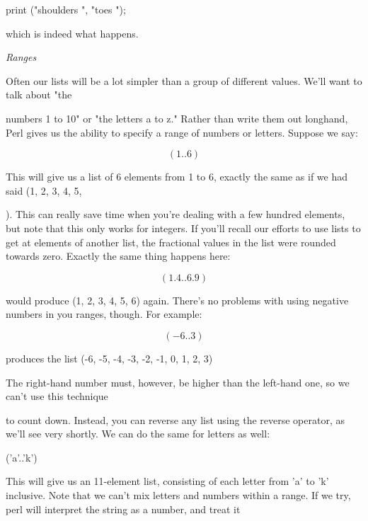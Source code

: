 \documentclass[a4paper,11pt]{book}
\begin{document}
\noindent 

\noindent 

\noindent print ("shoulders ", "toes ");

\noindent 

\noindent which is indeed what happens.

\noindent 

\noindent 

\noindent \textit{Ranges}

\noindent Often our lists will be a lot simpler than a group of different values. We'll want to talk about "the

\noindent numbers 1 to 10" or "the letters a to z." Rather than write them out longhand, Perl gives us the ability to specify a range of numbers or letters. Suppose we say:

\noindent 

\[(1 .. 6)\] 


\noindent This will give us a list of 6 elements from 1 to 6, exactly the same as if we had said (1, 2, 3, 4, 5,

). This can really save time when you're dealing with a few hundred elements, but note that this only works for integers. If you'll recall our efforts to use lists to get at elements of another list, the fractional values in the list were rounded towards zero. Exactly the same thing happens here:

\noindent 

\[(1.4 .. 6.9)\] 


\noindent would produce (1, 2, 3, 4, 5, 6) again. There's no problems with using negative numbers in you ranges, though. For example:

\noindent 

\[(-6 .. 3)\] 


\noindent produces the list (-6, -5, -4, -3, -2, -1, 0, 1, 2, 3)

\noindent 

\noindent The right-hand number must, however, be higher than the left-hand one, so we can't use this technique

\noindent to count down. Instead, you can reverse any list using the reverse operator, as we'll see very shortly. We can do the same for letters as well:

\noindent ('a'..'k')

\noindent 

\noindent This will give us an 11-element list, consisting of each letter from 'a' to 'k' inclusive. Note that we can't mix letters and numbers within a range. If we try, perl will interpret the string as a number, and treat it
\end{document}
